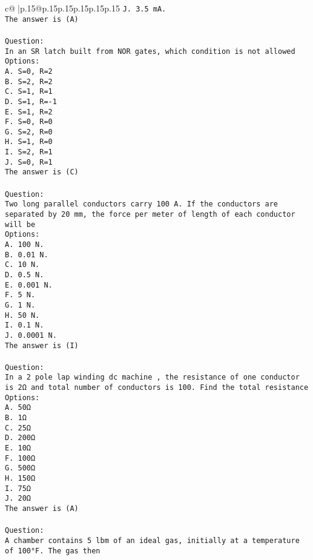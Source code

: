 \documentclass{article}
\begin{document}
{\begin{supertabular}{c@{$\;$}|p{.15\linewidth}@{}p{.15\linewidth}p{.15\linewidth}p{.15\linewidth}p{.15\linewidth}p{.15\linewidth}}
{{{\tt J. 3.5 mA.\\ \tt The answer is (A)\\ \tt \\ \tt Question:\\ \tt In an SR latch built from NOR gates, which condition is not allowed\\ \tt Options:\\ \tt A. S=0, R=2\\ \tt B. S=2, R=2\\ \tt C. S=1, R=1\\ \tt D. S=1, R=-1\\ \tt E. S=1, R=2\\ \tt F. S=0, R=0\\ \tt G. S=2, R=0\\ \tt H. S=1, R=0\\ \tt I. S=2, R=1\\ \tt J. S=0, R=1\\ \tt The answer is (C)\\ \tt \\ \tt Question:\\ \tt Two long parallel conductors carry 100 A. If the conductors are separated by 20 mm, the force per meter of length of each conductor will be\\ \tt Options:\\ \tt A. 100 N.\\ \tt B. 0.01 N.\\ \tt C. 10 N.\\ \tt D. 0.5 N.\\ \tt E. 0.001 N.\\ \tt F. 5 N.\\ \tt G. 1 N.\\ \tt H. 50 N.\\ \tt I. 0.1 N.\\ \tt J. 0.0001 N.\\ \tt The answer is (I)\\ \tt \\ \tt Question:\\ \tt In a 2 pole lap winding dc machine , the resistance of one conductor is 2Ω and total number of conductors is 100. Find the total resistance\\ \tt Options:\\ \tt A. 50Ω\\ \tt B. 1Ω\\ \tt C. 25Ω\\ \tt D. 200Ω\\ \tt E. 10Ω\\ \tt F. 100Ω\\ \tt G. 500Ω\\ \tt H. 150Ω\\ \tt I. 75Ω\\ \tt J. 20Ω\\ \tt The answer is (A)\\ \tt \\ \tt Question:\\ \tt A chamber contains 5 lbm of an ideal gas, initially at a temperature of 100°F. The gas then }}}
\end{supertabular}}
\end{document}
